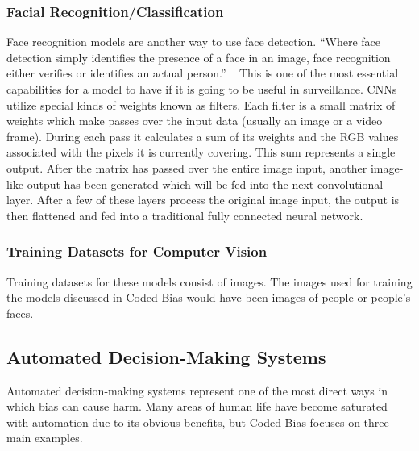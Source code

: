 \documentclass[sigconf, 10pt]{acmart}
\begin{document}
\subsubsection{Facial Recognition/Classification}
Face recognition models are another way to use face detection. “Where face detection simply identifies the presence of a face in an image, face recognition either verifies or identifies an actual person.” ~\cite{used_third(2)} This is one of the most essential capabilities for a model to have if it is going to be useful in surveillance. CNNs utilize special kinds of weights known as filters. Each filter is a small matrix of weights which make passes over the input data (usually an image or a video frame). During each pass it calculates a sum of its weights and the RGB values associated with the pixels it is currently covering. This sum represents a single output. After the matrix has passed over the entire image input, another image-like output has been generated which will be fed into the next convolutional layer. After a few of these layers process the original image input, the output is then flattened and fed into a traditional fully connected neural network.
\subsubsection{Training Datasets for Computer Vision}
Training datasets for these models consist of images. The images used for training the models discussed in Coded Bias would have been images of people or people’s faces.
\subsection{Automated Decision-Making Systems}
Automated decision-making systems represent one of the most direct ways in which bias can cause harm. Many areas of human life have become saturated with automation due to its obvious benefits, but Coded Bias focuses on three main examples.
\end{document}
